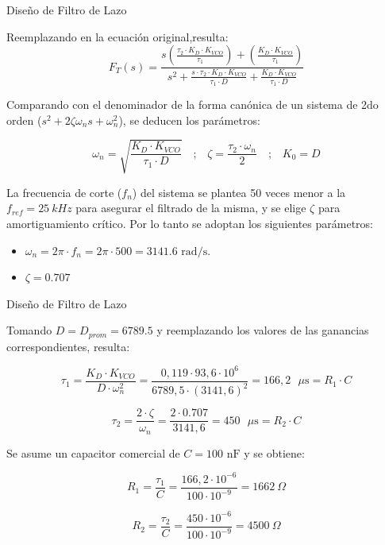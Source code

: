 \documentclass[10pt]{beamer}
\begin{document}
\begin{frame}{Diseño de Filtro de Lazo}

Reemplazando en la ecuación original,resulta:
$$F_T(s) = \frac{s \left(\frac{\tau_2 \cdot K_D \cdot K_{VCO}}{\tau_1}\right) + \left(\frac{K_D \cdot K_{VCO}}{\tau_1}\right)}{s^2 + \frac{s \cdot \tau_2 \cdot K_D \cdot K_{VCO}}{\tau_1 \cdot D} + \frac{K_D \cdot K_{VCO}}{\tau_1 \cdot D}}$$

Comparando con el denominador de la forma canónica de un sistema de 2do orden ($s^2 + 2\zeta \omega_ns + \omega_n^2$), se deducen los parámetros:

$$ \omega_n = \sqrt{\frac{K_D \cdot K_{VCO}}{\tau_1 \cdot D}} \quad \text{;} \quad \zeta = \frac{\tau_2 \cdot \omega_n}{2} \quad \text{;} \quad K_0 = D$$

\vspace{0.2 cm}

La frecuencia de corte ($f_n$) del sistema se plantea 50 veces menor a la $f_{ref} = 25~kHz$ para asegurar el filtrado de la misma, y se elige $\zeta$ para amortiguamiento crítico. Por lo tanto se adoptan los siguientes parámetros:
\begin{itemize}
    \item $\omega_n = 2\pi \cdot f_n = 2\pi \cdot 500 = 3141.6\text{ rad/s}$.
    \item $\zeta = 0.707$ 
\end{itemize}
\end{frame}

\begin{frame}{Diseño de Filtro de Lazo}
    
Tomando $D = D_{prom} = 6789.5$ y reemplazando los valores de las ganancias correspondientes, resulta:

$$ \tau_1 = \frac{K_D \cdot K_{VCO}}{D \cdot \omega_n^2} = \frac{0,119 \cdot 93,6 \cdot 10^6}{6789,5 \cdot (3141,6)^2} =166,2\text{ }\mu\text{s} = R_1 \cdot C$$

$$ \tau_2 = \frac{2 \cdot \zeta}{\omega_n} = \frac{2 \cdot 0.707}{3141,6} = 450\text{ }\mu\text{s} = R_2 \cdot C$$

\vspace{0.2 cm}

Se asume un capacitor comercial de $C = 100\text{ nF}$ y se obtiene:

$$ R_1 = \frac{\tau_1}{C} = \frac{166,2 \cdot 10^{-6}}{100 \cdot 10^{-9}} = 1662 \ \Omega$$

$$ R_2 = \frac{\tau_2}{C} = \frac{450 \cdot 10^{-6}}{100 \cdot 10^{-9}} = 4500 \ \Omega$$

\end{frame}
\end{document}
